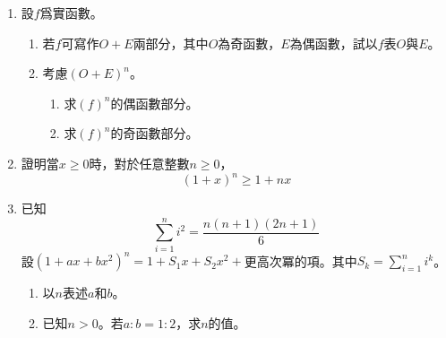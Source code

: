 \documentclass[12pt]{article}
\begin{document}
    \begin{enumerate}
        \item 設$f$爲實函數。\begin{enumerate}
            \item 若$f$可寫作$O+E$兩部分，其中$O$為奇函數，$E$為偶函數，試以$f$表$O$與$E$。
            \item 考慮$(O+E)^n$。\begin{enumerate}
                \item 求$(f)^n$的偶函數部分。
                \item 求$(f)^n$的奇函數部分。
            \end{enumerate}
        \end{enumerate}

        \item 證明當$x\geq 0$時，對於任意整數$n\geq 0$，$$(1+x)^n\geq 1+nx$$
        
        \item 已知$$\sum_{i=1}^{n}i^2=\frac{n(n+1)(2n+1)}{6}$$
        設$(1+ax+bx^2)^n=1+S_1x+S_2x^2+$更高次冪的項。其中$S_k=\sum_{i=1}^{n}i^k$。\begin{enumerate}
            \item 以$n$表述$a$和$b$。
            \item 已知$n>0$。若$a:b=1:2$，求$n$的值。
        \end{enumerate}
    \end{enumerate}
\end{document}
